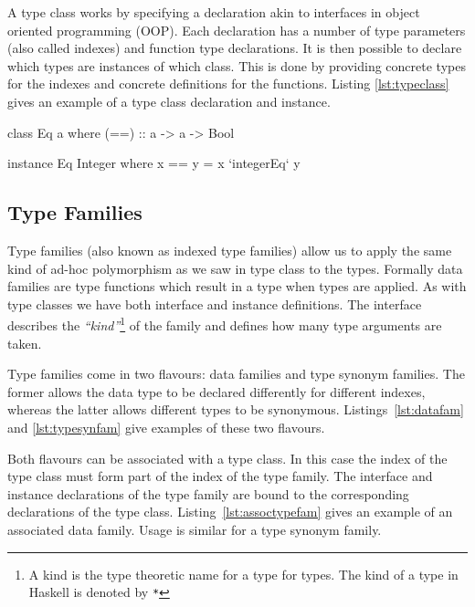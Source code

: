 \documentclass[12pt,a4paper,oneside]{scrbook}
\begin{document}
A type class works by specifying a declaration akin to interfaces in object
oriented programming (OOP). Each declaration has a number of type parameters
(also called indexes) and function type declarations. It is then possible to
declare which types are instances of which class. This is done by providing
concrete types for the indexes and concrete definitions for the
functions. Listing \ref{lst:typeclass} gives an example of a type class
declaration and instance.

\begin{hflisting}[label=lst:typeclass, caption={An example type class for
    equality. Showing the declaration and the instance for integers. Where
    \texttt{integerEq} is the implementation of integer equality on the target
    machine.}]

class Eq a where
  (==) :: a -> a -> Bool

instance Eq Integer where
  x == y =  x `integerEq` y

\end{hflisting}

\subsection{Type Families}
\label{sec:typefam}

Type families (also known as indexed type families) allow us to apply the same
kind of ad-hoc polymorphism as we saw in type class to the types. Formally data
families are type functions which result in a type when types are applied. As
with type classes we have both interface and instance definitions. The interface
describes the \emph{``kind''}\footnote{A kind is the type theoretic name for a
  type for types. The kind of a type in Haskell is denoted by \texttt{*}} of the
family and defines how many type arguments are taken.

Type families come in two flavours: data families and type synonym families. The
former allows the data type to be declared differently for different indexes,
whereas the latter allows different types to be
synonymous. Listings~\ref{lst:datafam} and \ref{lst:typesynfam} give examples of
these two flavours.

Both flavours can be associated with a type class. In this case the index of the
type class must form part of the index of the type family. The interface and
instance declarations of the type family are bound to the corresponding
declarations of the type class. Listing~\ref{lst:assoctypefam} gives an example
of an associated data family. Usage is similar for a type synonym family.
\end{document}
